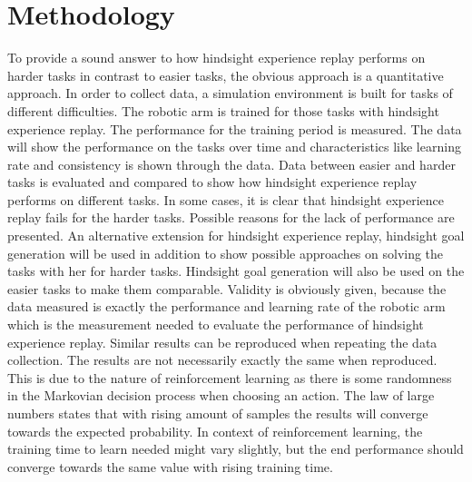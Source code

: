 \chapter{Methodology}

To provide a sound answer to how hindsight experience replay performs on harder tasks in contrast to easier tasks, the obvious approach is a quantitative approach. 
In order to collect data, a simulation environment is built for tasks of different difficulties. The robotic arm is trained for those tasks with hindsight experience replay. The performance for the training period is measured. The data will show the performance on the tasks over time and characteristics like learning rate and consistency is shown through the data. 
Data between easier and harder tasks is evaluated and compared to show how hindsight experience replay performs on different tasks. 
In some cases, it is clear that hindsight experience replay fails for the harder tasks. Possible reasons for the lack of performance are presented. An alternative extension for hindsight experience replay, hindsight goal generation will be used in addition to show possible approaches on solving the tasks with her for harder tasks. Hindsight goal generation will also be used on the easier tasks to make them comparable.
Validity is obviously given, because the data measured is exactly the performance and learning rate of the robotic arm which is the measurement needed to evaluate the performance of hindsight experience replay.
Similar results can be reproduced when repeating the data collection. The results are not necessarily exactly the same when reproduced. This is due to the nature of reinforcement learning as there is some randomness in the Markovian decision process when choosing an action. The law of large numbers %
 states that with rising amount of samples the results will converge towards the expected probability. In context of reinforcement learning, the training time to learn needed might vary slightly, but the end performance should converge towards the same value with rising training time.

   